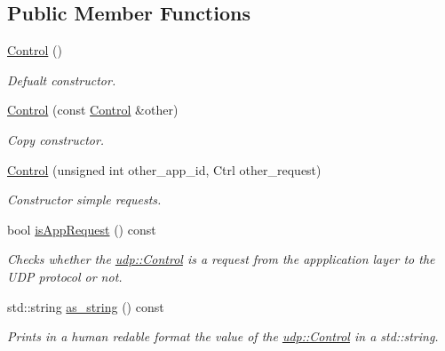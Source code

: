 \subsection*{Public Member Functions}
\begin{DoxyCompactItemize}
\item 
\hyperlink{structudp_1_1Control_ab2d271ca88530c8d7a983d44b8360101}{Control} ()
\begin{DoxyCompactList}\small\item\em Defualt constructor. \end{DoxyCompactList}\item 
\hyperlink{structudp_1_1Control_a80ead121f346f13f0541ebc2b8d5e85c}{Control} (const \hyperlink{structudp_1_1Control}{Control} \&other)
\begin{DoxyCompactList}\small\item\em Copy constructor. \end{DoxyCompactList}\item 
\hyperlink{structudp_1_1Control_a52fc45d985e82b72f2866315400db2a7}{Control} (unsigned int other\+\_\+app\+\_\+id, Ctrl other\+\_\+request)
\begin{DoxyCompactList}\small\item\em Constructor simple requests. \end{DoxyCompactList}\item 
bool \hyperlink{structudp_1_1Control_aca09c51711169fbe9631531e80d3c8b6}{is\+App\+Request} () const 
\begin{DoxyCompactList}\small\item\em Checks whether the \hyperlink{structudp_1_1Control}{udp\+::\+Control} is a request from the appplication layer to the U\+DP protocol or not. \end{DoxyCompactList}\item 
std\+::string \hyperlink{structudp_1_1Control_ad1fcb10d98b4f729bdf6bd54949940d4}{as\+\_\+string} () const 
\begin{DoxyCompactList}\small\item\em Prints in a human redable format the value of the \hyperlink{structudp_1_1Control}{udp\+::\+Control} in a std\+::string. \end{DoxyCompactList}\end{DoxyCompactItemize}
